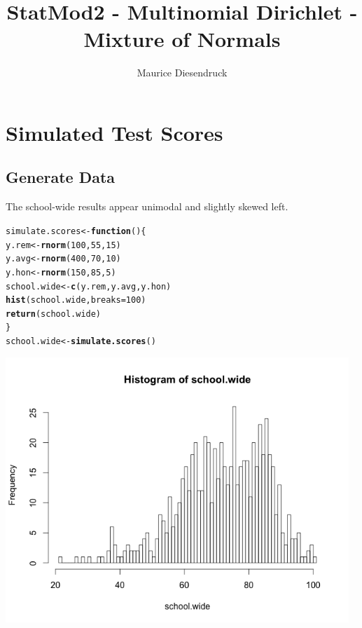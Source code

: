 \documentclass[12pt,letterpaper]{article}\usepackage[]{graphicx}\usepackage[]{color}
\author{Maurice Diesendruck\vspace{-2ex}}
\title{StatMod2 - Multinomial Dirichlet - Mixture of Normals\vspace{-1ex}}
\makeatletter
\newcommand{\hlnum}[1]{\textcolor[rgb]{0.686,0.059,0.569}{#1}}%
\newcommand{\hlstd}[1]{\textcolor[rgb]{0.345,0.345,0.345}{#1}}%
\newcommand{\hlkwa}[1]{\textcolor[rgb]{0.161,0.373,0.58}{\textbf{#1}}}%
\newcommand{\hlkwb}[1]{\textcolor[rgb]{0.69,0.353,0.396}{#1}}%
\newcommand{\hlkwc}[1]{\textcolor[rgb]{0.333,0.667,0.333}{#1}}%
\newcommand{\hlkwd}[1]{\textcolor[rgb]{0.737,0.353,0.396}{\textbf{#1}}}%
\newenvironment{kframe}{%
 \def\at@end@of@kframe{}%
 \ifinner\ifhmode%
  \def\at@end@of@kframe{\end{minipage}}%
  \begin{minipage}{\columnwidth}%
 \fi\fi%
 \def\FrameCommand##1{\hskip\@totalleftmargin \hskip-\fboxsep
 \colorbox{shadecolor}{##1}\hskip-\fboxsep
     \hskip-\linewidth \hskip-\@totalleftmargin \hskip\columnwidth}%
 \MakeFramed {\advance\hsize-\width
   \@totalleftmargin\z@ \linewidth\hsize
   \@setminipage}}%
 {\par\unskip\endMakeFramed%
 \at@end@of@kframe}
\newenvironment{knitrout}{}{} %
\makeatother
\begin{document}
\maketitle

\section{Simulated Test Scores}
\subsection{Generate Data}
The school-wide results appear unimodal and slightly skewed left.
\begin{knitrout}
\color{fgcolor}\begin{kframe}
\begin{alltt}
\hlstd{simulate.scores} \hlkwb{<-} \hlkwa{function}\hlstd{() \{}
  \hlstd{y.rem} \hlkwb{<-} \hlkwd{rnorm}\hlstd{(}\hlnum{100}\hlstd{,} \hlnum{55}\hlstd{,} \hlnum{15}\hlstd{)}
  \hlstd{y.avg} \hlkwb{<-} \hlkwd{rnorm}\hlstd{(}\hlnum{400}\hlstd{,} \hlnum{70}\hlstd{,} \hlnum{10}\hlstd{)}
  \hlstd{y.hon} \hlkwb{<-} \hlkwd{rnorm}\hlstd{(}\hlnum{150}\hlstd{,} \hlnum{85}\hlstd{,} \hlnum{5}\hlstd{)}
  \hlstd{school.wide} \hlkwb{<-} \hlkwd{c}\hlstd{(y.rem, y.avg, y.hon)}
  \hlkwd{hist}\hlstd{(school.wide,} \hlkwc{breaks}\hlstd{=}\hlnum{100}\hlstd{)}
  \hlkwd{return} \hlstd{(school.wide)}
\hlstd{\}}
\hlstd{school.wide} \hlkwb{<-} \hlkwd{simulate.scores}\hlstd{()}
\end{alltt}
\end{kframe}
\end{knitrout}
\includegraphics[height=10cm, keepaspectratio]{scores-simulated-data.png}\\
\end{document}
